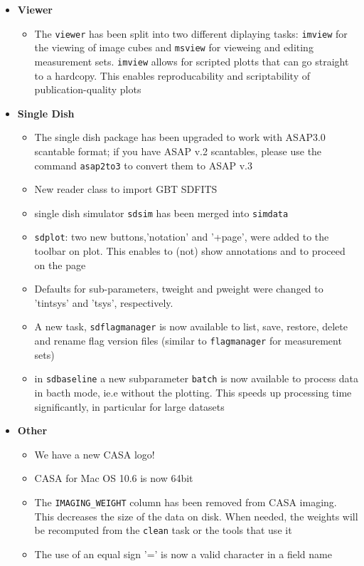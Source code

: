 \begin{itemize}
\begin{itemize}
    \end{itemize}

\item {\bf  Viewer }
     \begin{itemize}
     \item The {\tt viewer} has been split into two different diplaying tasks: {\tt imview} for the viewing of image cubes and {\tt msview} for vieweing and editing measurement sets. {\tt imview} allows for scripted plotts that can go straight to a hardcopy. This enables reproducability and scriptability of publication-quality plots

     \end{itemize}

\item {\bf  Single Dish }
  \begin{itemize}
    \item The single dish package has been upgraded to work with ASAP3.0 scantable format; if you have ASAP v.2 scantables, please use the command {\tt asap2to3} to convert them to ASAP v.3
    \item New reader class to import GBT SDFITS
    \item single dish simulator {\tt sdsim} has been merged into {\tt simdata} 
    \item {\tt sdplot}:  two new buttons,'notation' and '+page', were added to the toolbar on plot. This enables to (not) show annotations and to proceed on the page
    \item Defaults for sub-parameters, tweight and pweight were changed to 'tintsys' and 'tsys',  respectively.
    \item A new task, {\tt sdflagmanager} is now available to list, save, restore, delete and rename flag version files (similar to {\tt flagmanager} for measurement sets)
     \item in {\tt sdbaseline} a new subparameter {\tt batch} is now available to process data in bacth mode, ie.e without the plotting. This speeds up processing time significantly, in particular for large datasets

    \end{itemize}



\item {\bf  Other }
  \begin{itemize} 
  \item We have a new CASA logo!
  \item CASA for Mac OS 10.6 is now 64bit 
  \item The {\tt IMAGING\_WEIGHT} column has been removed from CASA imaging. This decreases the size of the data on disk. When needed, the weights will be recomputed from the {\tt clean} task or the tools that use it
   \item The use of an equal sign '=' is now a valid character in a field name
   
\end{itemize}

\end{itemize}

